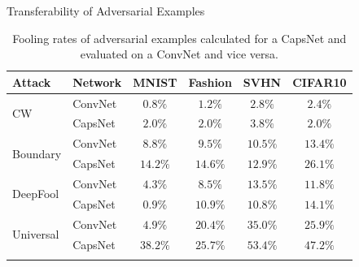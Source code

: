 \documentclass[final]{beamer}
\newlength{\onecolwid}
\newlength{\twocolwid}
\begin{document}
\begin{frame}[t]
\begin{columns}[t]
\begin{column}{\twocolwid}
\begin{columns}[t,totalwidth=\twocolwid]
\begin{column}{\onecolwid}
\begin{block}{Transferability of Adversarial Examples}
				\vspace{1cm}
				\begin{table}
					\centering\small{
						\begin{tabular}{llcccc}
							\toprule
							Attack & Network       & MNIST & Fashion & SVHN & CIFAR10  \\
							\midrule
							\multirow{2}{*}{CW} & ConvNet & $0.8\%$ & $1.2\%$ & $2.8\%$ & $2.4\%$ \\
							& CapsNet            & $2.0\%$ & $2.0\%$ & $3.8\%$ & $2.0\%$ \\
							\midrule
							\multirow{2}{*}{Boundary} & ConvNet & $8.8\%$ & $9.5\%$ & $10.5\%$ & $13.4\%$ \\
							& CapsNet            & $14.2\%$ & $14.6\%$ & $12.9\%$ & $26.1\%$ \\
							\midrule
							\multirow{2}{*}{DeepFool} & ConvNet & $4.3\%$ & $8.5\%$ & $13.5\%$ & $11.8\%$ \\
							& CapsNet           & $0.9\%$ & $10.9\%$ & $10.8\%$ & $14.1\%$ \\
							\midrule
							\multirow{2}{*}{Universal} & ConvNet & $4.9\%$ & $20.4\%$ & $35.0\%$ & $25.9\%$ \\
							& CapsNet           & $38.2\%$ & $25.7\%$ & $53.4\%$ & $47.2\%$ \\
							\bottomrule\\
					\end{tabular}}
					\caption{\phantom{T}Fooling rates of adversarial examples calculated for a CapsNet and evaluated on a ConvNet and vice versa.}
					\label{tab:attacks}
				\end{table}
						
					\end{block}
					

\end{column}
\end{columns}
\end{column}
\end{columns}
\end{frame}
\end{document}
